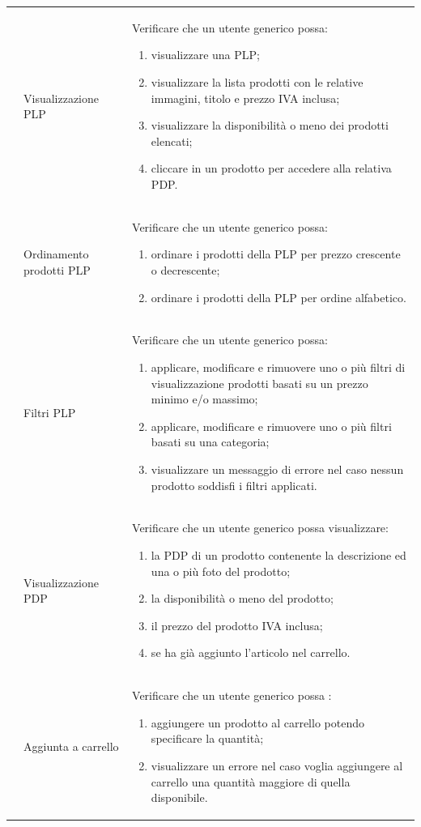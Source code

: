 \begin{center}
\begin{longtable}{|p{1cm}|p{4.85cm}|p{9cm}|}
	 & Visualizzazione PLP & Verificare che un utente generico possa: 
	\begin{enumerate}
		\item  visualizzare una PLP;
		\item  visualizzare la lista prodotti con le relative immagini, titolo e prezzo IVA inclusa;
		\item  visualizzare la disponibilità o meno dei prodotti elencati;
		\item  cliccare in un prodotto per accedere alla relativa PDP.
	\end{enumerate} \\

	 & Ordinamento prodotti PLP & Verificare che un utente generico possa: 
	\begin{enumerate}
		\item  ordinare i prodotti della PLP per prezzo crescente o decrescente;
		\item  ordinare i prodotti della PLP per ordine alfabetico.
	\end{enumerate} \\

	 & Filtri PLP & Verificare che un utente generico possa: 
	\begin{enumerate}
		\item  applicare, modificare e rimuovere uno o più filtri di visualizzazione prodotti basati su un prezzo minimo e/o massimo;
		\item  applicare, modificare e rimuovere uno o più filtri basati su una categoria;
		\item  visualizzare un messaggio di errore nel caso nessun prodotto soddisfi i filtri applicati.
	\end{enumerate} \\

	 & Visualizzazione PDP & Verificare che un utente generico possa visualizzare: 
	\begin{enumerate}
		\item   la PDP di un prodotto contenente la descrizione ed una o più foto del prodotto;
		\item   la disponibilità o meno del prodotto;
		\item   il prezzo del prodotto IVA inclusa;
		\item   se ha già aggiunto l'articolo nel carrello.
	\end{enumerate} \\

	 & Aggiunta a carrello & Verificare che un utente generico possa : 
	\begin{enumerate}
		\item   aggiungere un prodotto al carrello potendo specificare la quantità;
		\item   visualizzare un errore nel caso voglia aggiungere al carrello una quantità maggiore di quella disponibile.
	\end{enumerate} \\


\end{longtable}
\end{center}
